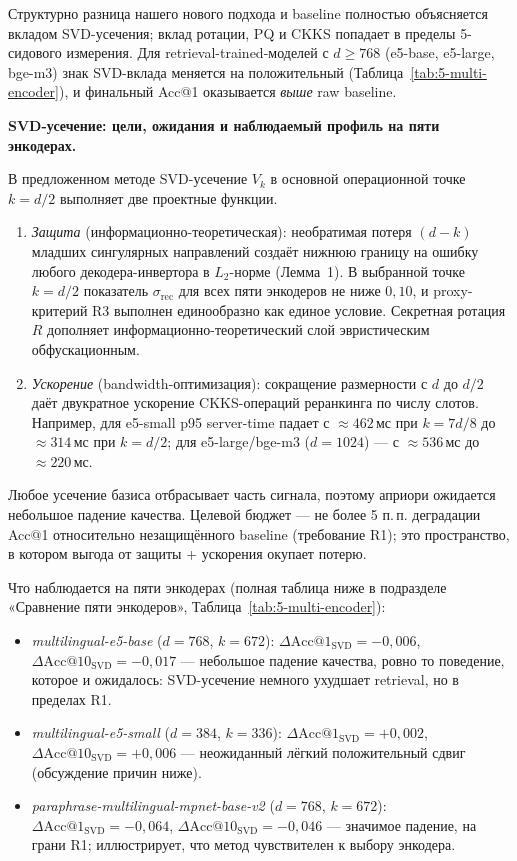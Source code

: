 \documentclass[a4paper, 12pt, oneside, openany]{article}
\begin{document}
Структурно разница нашего нового подхода и baseline полностью объясняется вкладом SVD-усечения; вклад ротации, PQ и CKKS попадает в пределы 5-сидового измерения. Для retrieval-trained-моделей с $d \geq 768$ (e5-base, e5-large, bge-m3) знак SVD-вклада меняется на положительный (Таблица~\ref{tab:5-multi-encoder}), и финальный Acc@1 оказывается \emph{выше} raw baseline.

\textbf{SVD-усечение: цели, ожидания и наблюдаемый профиль на пяти энкодерах.}

В предложенном методе SVD-усечение $V_k$ в основной операционной точке $k = d/2$ выполняет две проектные функции.
\begin{enumerate}
\item \emph{Защита} (информационно-теоретическая): необратимая потеря $(d - k)$ младших сингулярных направлений создаёт нижнюю границу на ошибку любого декодера-инвертора в $L_2$-норме (Лемма~1). В выбранной точке $k = d/2$ показатель $\sigma_{\mathrm{rec}}$ для всех пяти энкодеров не ниже $0{,}10$, и proxy-критерий R3 выполнен единообразно как единое условие. Секретная ротация $R$ дополняет информационно-теоретический слой эвристическим обфускационным.
\item \emph{Ускорение} (bandwidth-оптимизация): сокращение размерности с $d$ до $d/2$ даёт двукратное ускорение CKKS-операций реранкинга по числу слотов. Например, для e5-small p95 server-time падает с $\approx 462$\,мс при $k = 7d/8$ до $\approx 314$\,мс при $k = d/2$; для e5-large/bge-m3 ($d = 1024$) --- с $\approx 536$\,мс до $\approx 220$\,мс.
\end{enumerate}
 Любое усечение базиса отбрасывает часть сигнала, поэтому априори ожидается небольшое падение качества. Целевой бюджет --- не более 5 п.\,п. деградации Acc@1 относительно незащищённого baseline (требование R1); это пространство, в котором выгода от защиты + ускорения окупает потерю.

Что наблюдается на пяти энкодерах (полная таблица ниже в подразделе «Сравнение пяти энкодеров», Таблица~\ref{tab:5-multi-encoder}):
\begin{itemize}
\item \emph{multilingual-e5-base} ($d=768$, $k=672$): $\Delta\mathrm{Acc@1}_{\mathrm{SVD}} = -0{,}006$, $\Delta\mathrm{Acc@10}_{\mathrm{SVD}} = -0{,}017$ --- небольшое падение качества, ровно то поведение, которое и ожидалось: SVD-усечение немного ухудшает retrieval, но в пределах R1.
\item \emph{multilingual-e5-small} ($d=384$, $k=336$): $\Delta\mathrm{Acc@1}_{\mathrm{SVD}} = +0{,}002$, $\Delta\mathrm{Acc@10}_{\mathrm{SVD}} = +0{,}006$ --- неожиданный лёгкий положительный сдвиг (обсуждение причин ниже).
\item \emph{paraphrase-multilingual-mpnet-base-v2} ($d=768$, $k=672$): $\Delta\mathrm{Acc@1}_{\mathrm{SVD}} = -0{,}064$, $\Delta\mathrm{Acc@10}_{\mathrm{SVD}} = -0{,}046$ --- значимое падение, на грани R1; иллюстрирует, что метод чувствителен к выбору энкодера.
\end{itemize}
\end{document}
